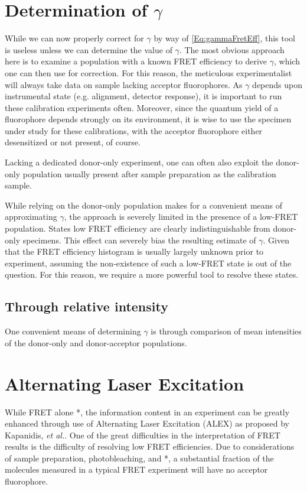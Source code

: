 \documentclass{article}
\begin{document}
\section{Determination of $\gamma$}
While we can now properly correct for $\gamma$ by way of
\eqref{Eq:gammaFretEff}, this tool is useless unless we can determine
the value of $\gamma$. The most obvious approach here is to examine a
population with a known FRET efficiency to derive $\gamma$, which one
can then use for correction. For this reason, the meticulous
experimentalist will always take data on sample lacking acceptor
fluorophores. As $\gamma$ depends upon instrumental state
(e.g. alignment, detector response), it is important to run these
calibration experiments often. Moreover, since the quantum yield of a
fluorophore depends strongly on its environment, it is wise to use the
specimen under study for these calibrations, with the acceptor
fluorophore either desensitized or not present, of course.

Lacking a dedicated donor-only experiment, one can often also
exploit the donor-only population usually present after sample
preparation as the calibration sample.

While relying on the donor-only population makes for a convenient
means of approximating $\gamma$, the approach is severely limited in
the presence of a low-FRET population. States low FRET efficiency are
clearly indistinguishable from donor-only specimens. This effect can
severely bias the resulting estimate of $\gamma$. Given that the FRET
efficiency histogram is usually largely unknown prior to experiment,
assuming the non-existence of such a low-FRET state is out of the
question. For this reason, we require a more powerful tool to resolve
these states.

\subsection{Through relative intensity}

One convenient means of determining $\gamma$ is through comparison of 
mean intensities of the donor-only and donor-acceptor populations. 


\section{Alternating Laser Excitation}
While FRET alone *, the information content in an experiment can be
greatly enhanced through use of Alternating Laser Excitation (ALEX) as
proposed by Kapanidis, {\it et al.}\cite{Kapanidis2005}. One of the
great difficulties in the interpretation of FRET results is the
difficulty of resolving low FRET efficiencies. Due to considerations
of sample preparation, photobleaching, and *, a substantial fraction
of the molecules measured in a typical FRET experiment will have no
acceptor fluorophore.
\end{document}
